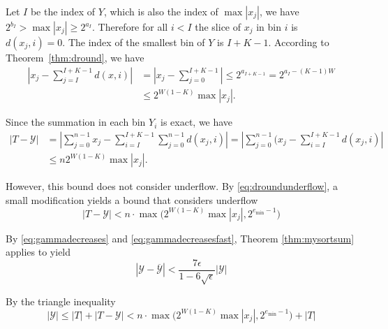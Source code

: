     Let $I$ be the index of $Y$, which is also the index of $\max|x_j|$,
    we have $2^{b_I} > \max|x_j| \geq 2^{a_I}$.
    Therefore for all $i < I$ the slice of $x_j$ in bin $i$ is $d(x_j, i) = 0$.
    The index of the smallest bin of $Y$ is $I + K - 1$.
    According to Theorem~\ref{thm:dround}, we have
    \begin{align*}
        |x_j - \sum_{j=I}^{I + K -1} d(x,i)|
            & = |x_j - \sum_{j=0}^{I + K - 1}|
            \leq 2^{a_{I + K -1}} 
            = 2^{a_I - (K-1)W} \\
            & \leq 2^{W(1-K)} \max|x_j|. 
    \end{align*}

    Since the summation in each bin $Y_i$ is exact, we have
    \begin{align}
        |T - \mathcal{Y}| & = |\sum_{j=0}^{n-1} x_j - \sum_{i=I}^{I+K-1} \sum_{j=0}^{n-1} d(x_j, i)|
            = |\sum_{j=0}^{n-1} (x_j - \sum_{i=I}^{I+K-1} d(x_j,i)| \nonumber \\
            & \leq n 2^{W(1-K)} \max|x_j|.
            \label{eq:repboundnaive}
    \end{align}

    However, this bound does not consider underflow. By
    \eqref{eq:droundunderflow}, a small modification yields a bound that
    considers underflow
    \begin{equation}
      \label{eq:repbound}
      |T - \mathcal{Y}| < n \cdot \max\bigl(2^{W  (1 - K)} \max|x_j|, 2^{e_{\min} - 1}\bigr)
    \end{equation}

    By  \eqref{eq:gammadecreases} and \eqref{eq:gammadecreasesfast},
    Theorem \ref{thm:mysortsum} applies to yield
    \begin{equation*}
      \left|\mathcal{Y} - \overline{\mathcal{Y}}\right| < \frac{7\epsilon}{1 - 6\sqrt\epsilon}|\mathcal{Y}|
    \end{equation*}

    By the triangle inequality
    \begin{equation*}
      |\mathcal{Y}| \leq |T| + |T - \mathcal{Y}| < n \cdot \max\bigl(2^{W(1-K)}  \max|x_j|, 2^{e_{\min} - 1}\bigr) + |T|
    \end{equation*}

